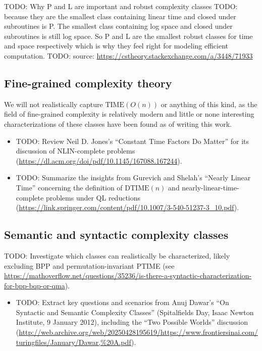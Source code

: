 TODO: Why P and L are important and robust complexity classes
TODO: because they are the smallest class containing linear time and closed under subroutines is P. The smallest class containing log space and closed under subroutines is still log space. So P and L are the smallest robust classes for time and space respectively which is why they feel right for modeling efficient computation.  
TODO: source: \url{https://cstheory.stackexchange.com/a/3448/71933}

\subsection{Fine-grained complexity theory}
We will not realistically capture $\text{TIME}(O(n))$ or anything of this kind,
as the field of fine-grained complexity is relatively modern and little or none interesting
characterizations of these classes have been found as of writing this work.
\begin{itemize}
\item TODO: Review Neil D. Jones's ``Constant Time Factors Do Matter'' for its discussion of NLIN-complete problems (\url{https://dl.acm.org/doi/pdf/10.1145/167088.167244}).
\item TODO: Summarize the insights from Gurevich and Shelah's ``Nearly Linear Time'' concerning the definition of $\mathrm{DTIME}(n)$ and nearly-linear-time-complete problems under QL reductions (\url{https://link.springer.com/content/pdf/10.1007/3-540-51237-3_10.pdf}).
\end{itemize}

\subsection{Semantic and syntactic complexity classes}
TODO: Investigate which classes can realistically be characterized, likely excluding BPP and permutation-invariant PTIME (see \url{https://mathoverflow.net/questions/35236/is-there-a-syntactic-characterization-for-bpp-bqp-or-qma}).
\begin{itemize}
\item TODO: Extract key questions and scenarios from Anuj Dawar's ``On Syntactic and Semantic Complexity Classes'' (Spitalfields Day, Isaac Newton Institute, 9 January 2012), including the ``Two Possible Worlds'' discussion (\url{http://web.archive.org/web/20250428195619/https://www.frontiersinai.com/turingfiles/January/Dawar,%20A.pdf}).

\end{itemize}
